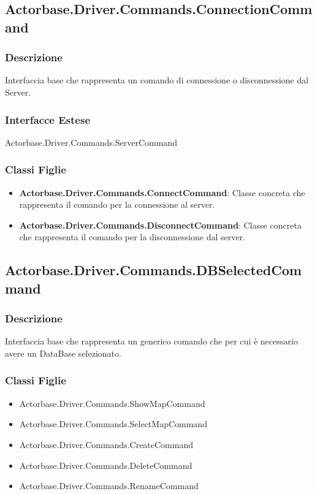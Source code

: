 \documentclass[a4paper]{article}
\begin{document}
		
		\subsection{Actorbase.Driver.Commands.ConnectionCommand}
			\subsubsection{Descrizione} Interfaccia base che rappresenta un comando di connessione o disconnessione dal Server.
			\subsubsection{Interfacce Estese} Actorbase.Driver.Commands.ServerCommand
			\subsubsection{Classi Figlie}
				\begin{itemize}
					\item \textbf{Actorbase.Driver.Commands.ConnectCommand}:
						Classe concreta che rappresenta il comando per la connessione al server.
					\item \textbf{Actorbase.Driver.Commands.DisconnectCommand}:
						Classe concreta che rappresenta il comando per la disconnessione dal server.
				\end{itemize}
		
		\subsection{Actorbase.Driver.Commands.DBSelectedCommand}
				\subsubsection{Descrizione} Interfaccia base che rappresenta un generico comando che per cui è necessario avere un DataBase selezionato.
				\subsubsection{Classi Figlie}
					\begin{itemize}
						\item Actorbase.Driver.Commands.ShowMapCommand
						\item Actorbase.Driver.Commands.SelectMapCommand
						\item Actorbase.Driver.Commands.CreateCommand
						\item Actorbase.Driver.Commands.DeleteCommand
						\item Actorbase.Driver.Commands.RenameCommand
					\end{itemize}
\end{document}
